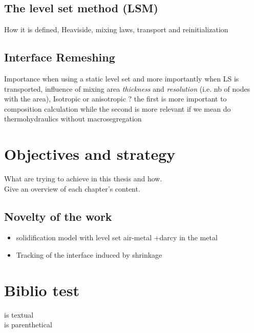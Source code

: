 \subsection{The level set method (LSM)}
How it is defined, Heaviside, mixing laws, transport and reinitialization
\subsection{Interface Remeshing}
Importance when using a static level set and more importantly when LS is transported,
influence of mixing area \emph{thickness} and \emph{resolution} (i.e. nb of nodes with the area),
Isotropic or anisotropic ? the first is more important to composition calculation while the second
is more relevant if we mean do thermohydraulics without macrosegregation

\section{Objectives and strategy}
What are trying to achieve in this thesis and how. \\
Give an overview of each chapter's content.

\subsection*{Novelty of the work}
\begin{itemize}
\item solidification model with level set air-metal +darcy in the metal
\item Tracking of the interface induced by shrinkage
\end{itemize}

\section{Biblio test}
\citet{carozzani_direct_2013} is textual \\
\citep{carozzani_direct_2013} is parenthetical \\
\citep{ahmad_numerical_1998} \\ 
\citep{beckermann_modelling_2002}
